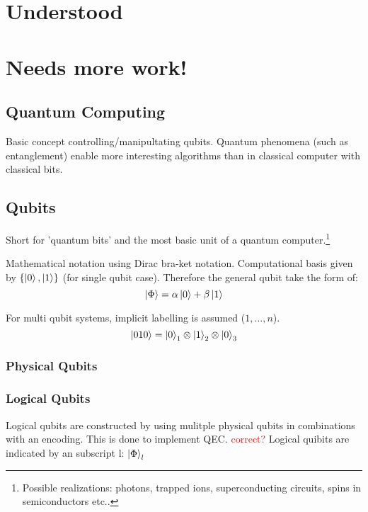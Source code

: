 \documentclass{article}
\author{leo}
\begin{document}
\section{Understood}

\section{Needs more work!}

\subsection{Quantum Computing}
Basic concept controlling/manipultating qubits.
Quantum phenomena (such as entanglement) enable more interesting algorithms than in classical computer with classical bits.

\subsection{Qubits}
Short for 'quantum bits' and the most basic unit of a quantum computer.\footnote{Possible realizations: photons, trapped ions, superconducting circuits, spins in semiconductors etc..}

Mathematical notation using Dirac bra-ket notation.
Computational basis given by $\{\ket{0}, \ket{1}\}$ (for single qubit case).
Therefore the general qubit take the form of:
\begin{equation*}
    \ket{\Phi} = \alpha \ket{0} + \beta \ket{1}
\end{equation*}

For multi qubit systems, implicit labelling is assumed ($1,...,n$).
\begin{equation*}
    \ket{010} = \ket{0}_1 \otimes \ket{1}_2 \otimes \ket{0}_3
\end{equation*}

\subsubsection{Physical Qubits}
\subsubsection{Logical Qubits}
Logical qubits are constructed by using mulitple physical qubits in combinations with an encoding.
This is done to implement QEC. \textcolor{red}{correct?}
Logical quibits are indicated by an subscript l: $\ket{\Phi}_l$
\end{document}
